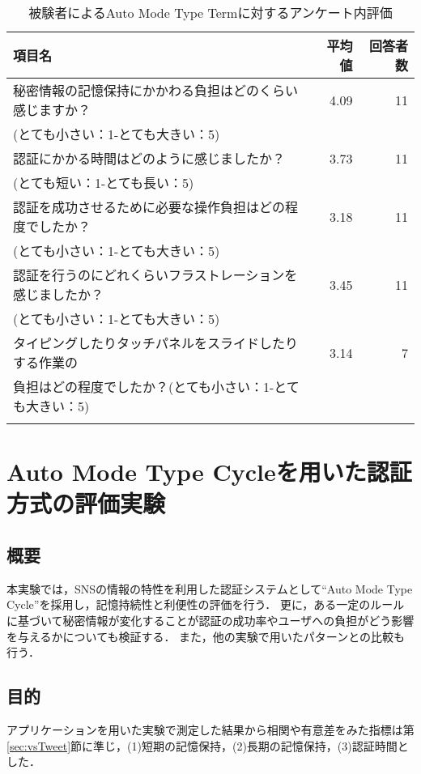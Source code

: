 \begin{table}[ht]
  \caption{被験者によるAuto Mode Type Termに対するアンケート内評価}
  \label{tab:auto_term.enquete}
  \begin{center}
    \small
    \begin{tabular}{lrr}
      \bhline
      項目名 & 平均値 & 回答者数 \\ \hline
      秘密情報の記憶保持にかかわる負担はどのくらい感じますか？ & 4.09 & 11 \\
      (とても小さい：1-とても大きい：5) & & \\
      認証にかかる時間はどのように感じましたか？ & 3.73 & 11 \\
      (とても短い：1-とても長い：5) & & \\
      認証を成功させるために必要な操作負担はどの程度でしたか？ & 3.18 & 11 \\
      (とても小さい：1-とても大きい：5) & & \\
      認証を行うのにどれくらいフラストレーションを感じましたか？ & 3.45 & 11 \\
      (とても小さい：1-とても大きい：5) & & \\
      タイピングしたりタッチパネルをスライドしたりする作業の & 3.14 & 7 \\
      負担はどの程度でしたか？(とても小さい：1-とても大きい：5) & & \\
      \bhline
    \end{tabular}
  \end{center}
\end{table}

\section{Auto Mode Type Cycleを用いた認証方式の評価実験}\label{sec:vsCycle}
\subsection{概要}
本実験では，SNSの情報の特性を利用した認証システムとして``Auto Mode Type Cycle''を採用し，記憶持続性と利便性の評価を行う．
更に，ある一定のルールに基づいて秘密情報が変化することが認証の成功率やユーザへの負担がどう影響を与えるかについても検証する．
また，他の実験で用いたパターンとの比較も行う．

\subsection{目的}
アプリケーションを用いた実験で測定した結果から相関や有意差をみた指標は第\ref{sec:vsTweet}節に準じ，(1)短期の記憶保持，(2)長期の記憶保持，(3)認証時間とした．

